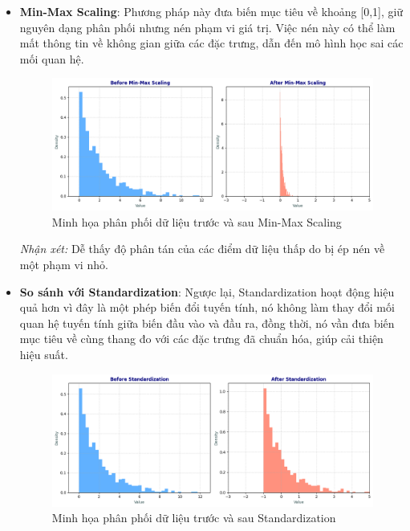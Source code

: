 \begin{itemize}
    \item \textbf{Min-Max Scaling}: Phương pháp này đưa biến mục tiêu về khoảng [0,1], giữ nguyên dạng phân phối nhưng nén phạm vi giá trị. Việc nén này có thể làm mất thông tin về không gian giữa các đặc trưng, dẫn đến mô hình học sai các mối quan hệ.

    \begin{figure}[H]
        \centering
        \includegraphics[width=1\linewidth]{img_multiple/output_min_max.png}
        \caption{Minh họa phân phối dữ liệu trước và sau Min-Max Scaling}
    \end{figure}

    \textit{Nhận xét:} Dễ thấy độ phân tán của các điểm dữ liệu thấp do bị ép nén về một phạm vi nhỏ.
    
    \item \textbf{So sánh với Standardization}: Ngược lại, Standardization hoạt động hiệu quả hơn vì đây là một phép biến đổi tuyến tính, nó không làm thay đổi mối quan hệ tuyến tính giữa biến đầu vào và đầu ra, đồng thời, nó vần đưa biến mục tiêu về cùng thang đo với các đặc trưng đã chuẩn hóa, giúp cải thiện hiệu suất.

    \begin{figure}[H]
        \centering
        \includegraphics[width=1\linewidth]{img_multiple/output_standard.png}
        \caption{Minh họa phân phối dữ liệu trước và sau Standardization}
    \end{figure}
\end{itemize}

